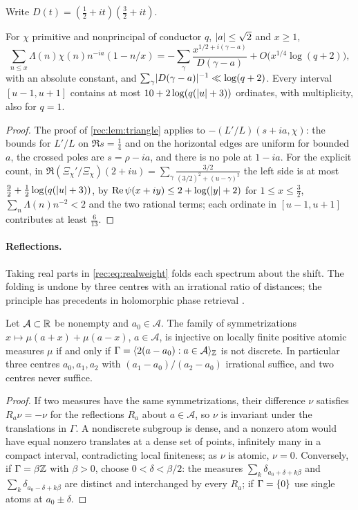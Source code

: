 Write $D(t)=(\tfrac12+it)(\tfrac32+it)$.

\begin{lemma}\label{rec:lem:shift}
For $\chi$ primitive and nonprincipal of conductor $q$, $\lvert a\rvert\le\sqrt2$ and $x\ge1$,
\[
 \sum_{n\le x}\Lambda(n)\chi(n)n^{-ia}(1-n/x)=-\sum_\gamma\frac{x^{1/2+i(\gamma-a)}}{D(\gamma-a)}+O\bigl(x^{1/4}\log(q+2)\bigr),
\]
with an absolute constant, and $\sum_\gamma\lvert D(\gamma-a)\rvert^{-1}\ll\log(q+2)$. Every interval $[u-1,u+1]$ contains at
most $10+2\log(q(\lvert u\rvert+3))$ ordinates, with multiplicity, also for $q=1$.
\end{lemma}

\begin{proof}
The proof of \cref{rec:lem:triangle} applies to $-(L'/L)(s+ia,\chi)$: the bounds for $L'/L$ on $\Re s=\tfrac14$
and on the horizontal edges are uniform for bounded $a$, the crossed poles are $s=\rho-ia$, and there is
no pole at $1-ia$. For the explicit count, in
$\Re(\Xi_\chi'/\Xi_\chi)(2+iu)=\sum_\gamma\frac{3/2}{(3/2)^2+(u-\gamma)^2}$ the left side is at most
$\tfrac92+\tfrac12\log(q(\lvert u\rvert+3))$, by $\operatorname{Re}\psi(x+iy)\le2+\log(\lvert y\rvert+2)$ for $1\le x\le\tfrac32$,
$\sum_n\Lambda(n)n^{-2}<2$ and the two rational terms; each ordinate in $[u-1,u+1]$ contributes at least
$\tfrac6{13}$.
\end{proof}

\paragraph{Reflections.}
Taking real parts in \eqref{rec:eq:realweight} folds each spectrum about the shift. The folding is undone
by three centres with an irrational ratio of distances; the principle has precedents in holomorphic
phase retrieval \cite{Liehr2024Arithmetic,Wellershoff2024Phase}.

\begin{proposition}\label{rec:prop:reflection}
Let $\mathcal A\subset\mathbb{R}$ be nonempty and $a_0\in\mathcal A$. The family of symmetrizations
$x\mapsto\mu(a+x)+\mu(a-x)$, $a\in\mathcal A$, is injective on locally finite positive atomic measures $\mu$ if and
only if $\Gamma=\langle2(a-a_0):a\in\mathcal A\rangle_{\mathbb{Z}}$ is not discrete. In particular three centres $a_0,a_1,a_2$ with
$(a_1-a_0)/(a_2-a_0)$ irrational suffice, and two centres never suffice.
\end{proposition}

\begin{proof}
If two measures have the same symmetrizations, their difference $\nu$ satisfies $R_a\nu=-\nu$ for the
reflections $R_a$ about $a\in\mathcal A$, so $\nu$ is invariant under the translations in $\Gamma$. A nondiscrete
subgroup is dense, and a nonzero atom would have equal nonzero translates at a dense set of points,
infinitely many in a compact interval, contradicting local finiteness; as $\nu$ is atomic, $\nu=0$.
Conversely, if $\Gamma=\beta\mathbb{Z}$ with $\beta>0$, choose $0<\delta<\beta/2$: the measures $\sum_k\delta_{a_0+\delta+k\beta}$ and
$\sum_k\delta_{a_0-\delta+k\beta}$ are distinct and interchanged by every $R_a$; if $\Gamma=\{0\}$ use single atoms at
$a_0\pm\delta$.
\end{proof}

